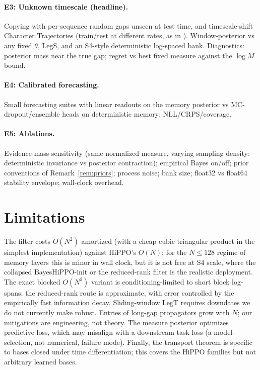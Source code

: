 \documentclass[11pt]{article}
\begin{document}
\paragraph{E3: Unknown timescale (headline).} Copying with per-sequence random gaps unseen at test time, and timescale-shift Character Trajectories (train/test at different rates, as in \citet{gu2020hippo}). Window-posterior vs any fixed $\theta$, LegS, and an S4-style deterministic log-spaced bank. Diagnostics: posterior mass near the true gap; regret vs best fixed measure against the $\log M$ bound.

\paragraph{E4: Calibrated forecasting.} Small forecasting suites with linear readouts on the memory posterior vs MC-dropout/ensemble heads on deterministic memory; NLL/CRPS/coverage.

\paragraph{E5: Ablations.} Evidence-mass sensitivity (same normalized measure, varying sampling density: deterministic invariance vs posterior contraction); empirical Bayes on/off; prior conventions of Remark~\ref{rem:priors}; process noise; bank size; float32 vs float64 stability envelope; wall-clock overhead.

\section{Limitations}

The filter costs $O(N^2)$ amortized (with a cheap cubic triangular product in the simplest implementation) against HiPPO's $O(N)$; for the $N\le128$ regime of memory layers this is minor in wall clock, but it is not free at S4 scale, where the collapsed BayesHiPPO-init or the reduced-rank filter is the realistic deployment. The exact blocked $O(N^2)$ variant is conditioning-limited to short block log-spans; the reduced-rank route is approximate, with error controlled by the empirically fast information decay. Sliding-window LegT requires downdates we do not currently make robust. Entries of long-gap propagators grow with $N$; our mitigations are engineering, not theory. The measure posterior optimizes predictive loss, which may misalign with a downstream task loss (a model-selection, not numerical, failure mode). Finally, the transport theorem is specific to bases closed under time differentiation; this covers the HiPPO families but not arbitrary learned bases.
\end{document}
